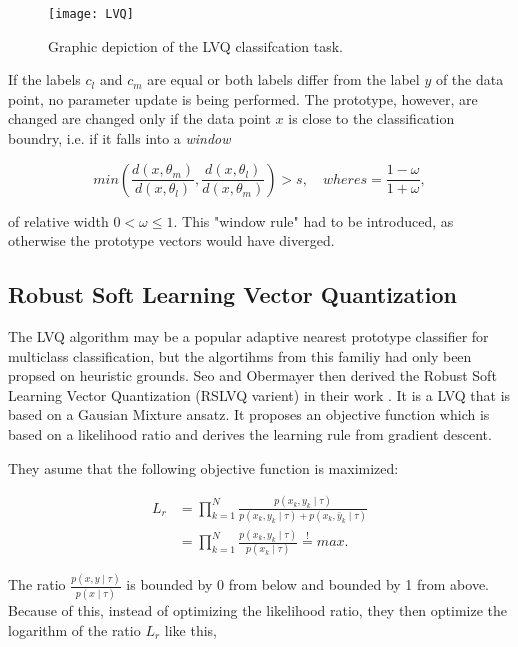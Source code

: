 \documentclass[12pt,oneside,a4paper,parskip]{scrbook}
\begin{document}
\begin{figure}[H]
  \texttt{[image: LVQ]}
  \caption{Graphic depiction of the LVQ classifcation task.}
  \label{fig:LVQ}
\end{figure}

If the labels $c_l$ and $c_m$ are equal or both labels differ from the label $y$ of the data point, no parameter update is being performed.
The prototype, however, are changed are changed only if the data point $x$ is close to the classification boundry, i.e.
if it falls into a \textit{window}

\begin{equation}
    min(\frac{d(x,\theta_m)}{d(x,\theta_l)},\frac{d(x,\theta_l)}{d(x,\theta_m)}) > s, \quad where s = \frac{1-\omega}{1+\omega},
\end{equation}

of relative width $0<\omega\leq1$. This "window rule" had to be introduced, as otherwise the prototype vectors would have diverged. \cite{RSLVQOrig}

\subsection{Robust Soft Learning Vector Quantization}

The LVQ algorithm may be a popular adaptive nearest prototype classifier for multiclass classification, 
but the algortihms from this familiy had only been propsed on heuristic grounds. Seo and Obermayer then derived the 
Robust Soft Learning Vector Quantization (RSLVQ varient) in their work \cite{RSLVQOrig}. It is a LVQ that is based on 
a Gausian Mixture ansatz. It proposes an objective function which is based on a likelihood ratio and derives the
learning rule from gradient descent.

They asume that the following objective function is maximized:

\begin{equation}
  \begin{split}
    L_r &= \displaystyle\prod_{k=1}^{N} \frac{p(x_k, y_k\mid\tau)}{p(x_k, y_k\mid\tau) + p(x_k, \bar{y}_k\mid\tau)} \\
        &= \displaystyle\prod_{k=1}^{N} \frac{p(x_k, y_k\mid\tau)}{p(x_k\mid\tau)}  \overset{!}{=} max.
  \end{split}
\end{equation}

The ratio $\frac{p(x, y\mid\tau)}{p(x\mid\tau)}$ is bounded by 0 from below and bounded by 1 from above. Because of this, 
instead of optimizing the likelihood ratio, they then optimize the 
logarithm of the ratio $L_r$ like this,
\end{document}
